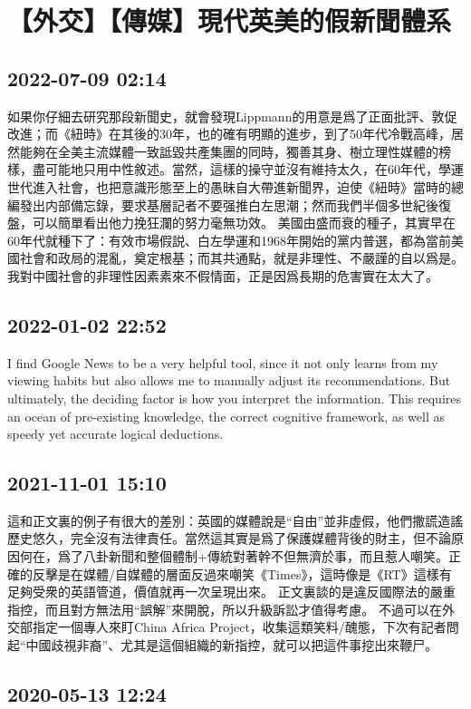 \documentclass[twocolumn]{ctexart}
\begin{document}
\section*{【外交】【傳媒】現代英美的假新聞體系}
\subsection*{2022-07-09 02:14}

如果你仔細去研究那段新聞史，就會發現Lippmann的用意是爲了正面批評、敦促改進；而《紐時》在其後的30年，也的確有明顯的進步，到了50年代冷戰高峰，居然能夠在全美主流媒體一致詆毀共產集團的同時，獨善其身、樹立理性媒體的榜樣，盡可能地只用中性敘述。當然，這樣的操守並沒有維持太久，在60年代，學運世代進入社會，也把意識形態至上的愚昧自大帶進新聞界，迫使《紐時》當時的總編發出内部備忘錄，要求基層記者不要强推白左思潮；然而我們半個多世紀後復盤，可以簡單看出他力挽狂瀾的努力毫無功效。
美國由盛而衰的種子，其實早在60年代就種下了：有效市場假説、白左學運和1968年開始的黨内普選，都為當前美國社會和政局的混亂，奠定根基；而其共通點，就是非理性、不嚴謹的自以爲是。我對中國社會的非理性因素素來不假情面，正是因爲長期的危害實在太大了。
\subsection*{2022-01-02 22:52}

I find Google News to be a very helpful tool, since it not only learns from my viewing habits but also allows me to manually adjust its recommendations. But ultimately, the deciding factor is how you interpret the information. This requires an ocean of pre-existing knowledge, the correct cognitive framework, as well as speedy yet accurate logical deductions.
\subsection*{2021-11-01 15:10}

這和正文裏的例子有很大的差別：英國的媒體說是“自由”並非虛假，他們撒謊造謠歷史悠久，完全沒有法律責任。當然這其實是爲了保護媒體背後的財主，但不論原因何在，爲了八卦新聞和整個體制+傳統對著幹不但無濟於事，而且惹人嘲笑。正確的反擊是在媒體/自媒體的層面反過來嘲笑《Times》，這時像是《RT》這樣有足夠受衆的英語管道，價值就再一次呈現出來。
正文裏談的是違反國際法的嚴重指控，而且對方無法用“誤解”來開脫，所以升級訴訟才值得考慮。
不過可以在外交部指定一個專人來盯China Africa Project，收集這類笑料/醜態，下次有記者問起“中國歧視非裔”、尤其是這個組織的新指控，就可以把這件事挖出來鞭尸。
\subsection*{2020-05-13 12:24}
\end{document}
